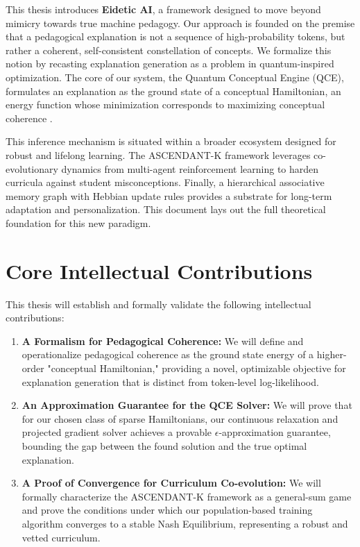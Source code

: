 \documentclass[11pt, letterpaper]{article}
\begin{document}
This thesis introduces \textbf{Eidetic AI}, a framework designed to move beyond mimicry towards true machine pedagogy. Our approach is founded on the premise that a pedagogical explanation is not a sequence of high-probability tokens, but rather a coherent, self-consistent constellation of concepts. We formalize this notion by recasting explanation generation as a problem in quantum-inspired optimization. The core of our system, the Quantum Conceptual Engine (QCE), formulates an explanation as the ground state of a conceptual Hamiltonian, an energy function whose minimization corresponds to maximizing conceptual coherence \cite{hopfield1982neural, feynman1982simulating}.

This inference mechanism is situated within a broader ecosystem designed for robust and lifelong learning. The ASCENDANT-K framework leverages co-evolutionary dynamics from multi-agent reinforcement learning \cite{sutton2018reinforcement} to harden curricula against student misconceptions. Finally, a hierarchical associative memory graph with Hebbian update rules provides a substrate for long-term adaptation and personalization. This document lays out the full theoretical foundation for this new paradigm.

\section{Core Intellectual Contributions}
This thesis will establish and formally validate the following intellectual contributions:
\begin{enumerate}
    \item \textbf{A Formalism for Pedagogical Coherence:} We will define and operationalize pedagogical coherence as the ground state energy of a higher-order "conceptual Hamiltonian," providing a novel, optimizable objective for explanation generation that is distinct from token-level log-likelihood.
    \item \textbf{An Approximation Guarantee for the QCE Solver:} We will prove that for our chosen class of sparse Hamiltonians, our continuous relaxation and projected gradient solver achieves a provable $\epsilon$-approximation guarantee, bounding the gap between the found solution and the true optimal explanation.
    \item \textbf{A Proof of Convergence for Curriculum Co-evolution:} We will formally characterize the ASCENDANT-K framework as a general-sum game and prove the conditions under which our population-based training algorithm converges to a stable Nash Equilibrium, representing a robust and vetted curriculum.
\end{enumerate}
\end{document}
